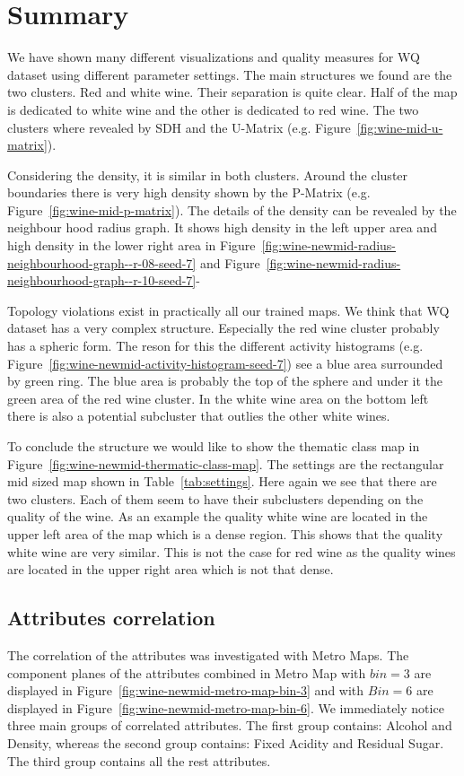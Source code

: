 \documentclass{acm_proc_article-sp}
\begin{document}
\section{Summary}

We have shown many different visualizations and quality measures for WQ dataset using different
parameter settings. The main structures
we found are the two clusters. Red and white wine. Their separation is quite clear. Half of 
the map is dedicated to white wine and the other is dedicated to red wine.
The two clusters where revealed by SDH and the U-Matrix (e.g. Figure~\ref{fig:wine-mid-u-matrix}).

Considering the density, it is similar in both clusters. Around the cluster boundaries there is
very high density shown by the P-Matrix (e.g. Figure~\ref{fig:wine-mid-p-matrix}). 
The details of the density can be revealed by the neighbour hood radius graph.
It shows high density in the left upper area and high density in the lower right area in
Figure~\ref{fig:wine-newmid-radius-neighbourhood-graph--r-08-seed-7} and Figure~\ref{fig:wine-newmid-radius-neighbourhood-graph--r-10-seed-7}-

Topology violations exist in practically all our trained maps. We think that WQ dataset has
a very complex structure. Especially the red wine cluster probably has a spheric form.
The reson for this the different activity histograms (e.g. Figure~\ref{fig:wine-newmid-activity-histogram-seed-7}) see a blue area surrounded by green ring. The blue area is probably the top of the sphere and
under it the green area of the red wine cluster. In the white wine area on the bottom left
there is also a potential subcluster that outlies the other white wines.

To conclude the structure we would like to show the thematic class map in Figure~\ref{fig:wine-newmid-thermatic-class-map}. The settings are the rectangular mid sized map shown in Table~\ref{tab:settings}.
Here again we see that there are two clusters. Each of them seem to have their subclusters depending
on the quality of the wine. As an example the quality white wine are located in the upper left area of
the map which is a dense region. This shows that the quality white wine are very similar.
This is not the case for red wine as the quality wines are located in the upper right area which is
not that dense.

\subsection{Attributes correlation}
The correlation of the attributes was investigated with Metro Maps. The component planes of the attributes combined in Metro Map with $bin=3$
are displayed in Figure~\ref{fig:wine-newmid-metro-map-bin-3} and with $Bin=6$ are displayed in Figure~\ref{fig:wine-newmid-metro-map-bin-6}.
We immediately notice three main groups of correlated attributes. The first group contains: Alcohol and Density, whereas the second group contains: Fixed Acidity and Residual Sugar. The third group contains all the rest attributes.
\end{document}
